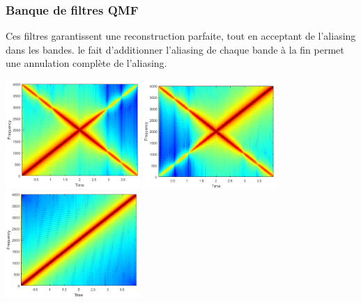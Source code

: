 \documentclass[letterpaper, 12pt]{article}
\newcommand{\alinea}{
\hspace*{0.5cm}}
\begin{document}
			\subsubsection*{Banque de filtres QMF}
				\alinea Ces filtres garantissent une reconstruction parfaite, tout en acceptant de l'aliasing dans les bandes.
					le fait d'additionner l'aliasing de chaque bande à la fin permet une annulation complète de l'aliasing.
				\begin{center}
					\includegraphics[width=2in]{Images/qmf1} \hfill \includegraphics[width=2in]{Images/qmf2} \hfill
					\includegraphics[width=2in]{Images/qmf3}
				\end{center}
\end{document}
